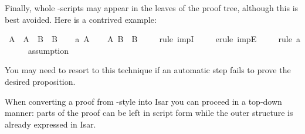 \begin{isabellebody}
\isamarkuptrue%
%
\isamarkuptrue%
%
\begin{isamarkuptext}%
Finally, whole -scripts may appear in the leaves of the
proof tree, although this is best avoided.  Here is a contrived example:%
\end{isamarkuptext}%
\isamarkuptrue%
\isamarkupfalse%
\ {\isachardoublequoteopen}A\ {\isasymlongrightarrow}\ {\isacharparenleft}A\ {\isasymlongrightarrow}\ B{\isacharparenright}\ {\isasymlongrightarrow}\ B{\isachardoublequoteclose}\isanewline
%
\isadelimproof
%
\endisadelimproof
%
\isatagproof
{}\isamarkupfalse%
\isanewline
\ \ \isamarkupfalse%
\ a{\isacharcolon}\ {\isachardoublequoteopen}A{\isachardoublequoteclose}\isanewline
\ \ \isamarkupfalse%
\ {\isachardoublequoteopen}{\isacharparenleft}A\ {\isasymlongrightarrow}B{\isacharparenright}\ {\isasymlongrightarrow}\ B{\isachardoublequoteclose}\isanewline
\ \ \ \ \isamarkupfalse%
{\isacharparenleft}rule\ impI{\isacharparenright}\isanewline
\ \ \ \ \isamarkupfalse%
{\isacharparenleft}erule\ impE{\isacharparenright}\isanewline
\ \ \ \ \isamarkupfalse%
{\isacharparenleft}rule\ a{\isacharparenright}\isanewline
\ \ \ \ \isamarkupfalse%
\ assumption\isanewline
\ \ \ \ \isamarkupfalse%
\isanewline
{}\isamarkupfalse%
%
\endisatagproof
{\isafoldproof}%
%
\isadelimproof
%
\endisadelimproof
%
\begin{isamarkuptext}%
\noindent You may need to resort to this technique if an
automatic step fails to prove the desired proposition.

When converting a proof from -style into Isar you can proceed
in a top-down manner: parts of the proof can be left in script form
while the outer structure is already expressed in Isar.%
\end{isamarkuptext}%
\isamarkuptrue%
%
\isadelimtheory
%
\endisadelimtheory
%
\isatagtheory
%
\endisatagtheory
{\isafoldtheory}%
%
\isadelimtheory
%
\endisadelimtheory
\end{isabellebody}%
